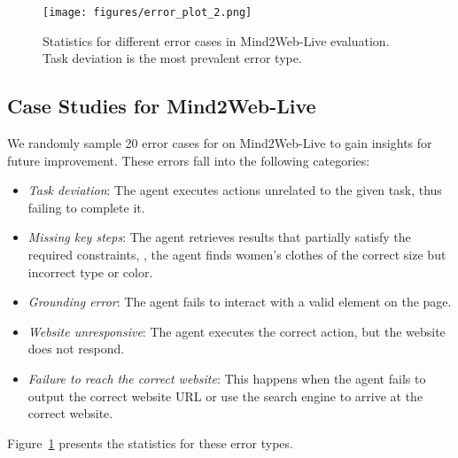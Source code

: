 \begin{figure}
    \centering
    \texttt{[image: figures/error\_plot\_2.png]}
    \caption{Statistics for different error cases in Mind2Web-Live evaluation. Task deviation is the most prevalent error type.
    }
    \label{fig:error_stats}
\end{figure}

\subsection{Case Studies for Mind2Web-Live}

We randomly sample 20 error cases for \model on Mind2Web-Live to gain insights for future improvement.
These errors fall into the following categories:
\begin{itemize}

\item \textit{Task deviation}: The agent executes actions unrelated to the given task, thus failing to complete it. 

 
\item \textit{Missing key steps}: The agent retrieves results that partially satisfy the required constraints, \eg, the agent finds women's clothes of the correct size but incorrect type or color.


\item \textit{Grounding error}: The agent fails to interact with a valid element on the page.

\item \textit{Website unresponsive}: The agent executes the correct action, but the website does not respond.

\item \textit{Failure to reach the correct website}: This happens when the agent fails to output the correct website URL or use the search engine to arrive at the correct website.

\end{itemize}
Figure~\ref{fig:error_stats} presents the statistics for these error types.